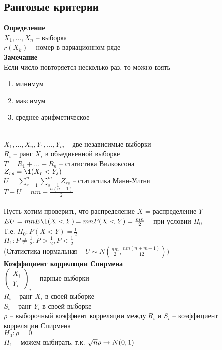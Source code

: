 \documentclass[12pt]{article}
\begin{document}
\subsection{Ранговые критерии}
\textbf{Определение}\\
$X_1, \ldots, X_n$ -- выборка\\
$r(X_k)$ -- номер в вариационном ряде\\
\textbf{Замечание}\\
Если число повторяется несколько раз, то можно взять
\begin{enumerate}
	\item минимум
	\item максимум
	\item среднее арифметическое
\end{enumerate}
\text{}\\
$X_1, \ldots, X_n, Y_1, \ldots, Y_m$ -- две независимые выборки\\
$R_i$ -- ранг $X_i$ в объединенной выборке\\
$T = R_1 + \ldots + R_n$ -- статистика Вилкоксона\\
$Z_{rs}=\1(X_r < Y_s)$\\
$U = \sum_{r=1}^n\sum_{s=1}^m Z_{rs}$ -- статистика Манн-Уитни\\
$T + U = nm + \frac{n(n+1)}{2}$\\\\
Пусть хотим проверить, что распределение $X$ = распределение $Y$\\
$E U = mn E\1(X<Y) = mnP(X < Y) = \frac{mn}2$ -- при условии $H_0$\\
Т.е. $H_0: P(X<Y) = \frac12$\\
$H_1: P \neq \frac12, P > \frac12, P < \frac12$\\
(Статистика нормальная -- $U \sim N(\frac{nm}2, \frac{nm(n+m+1)}{12}))$\\
\textbf{Коэффициент корреляции Спирмена}\\
$\left(\begin{array}{c}
	X_i\\Y_i
\end{array}\right)_i$ -- парные выборки\\
$R_i$ -- ранг $X_i$ в своей выборке\\
$S_i$ -- ранг $Y_i$ в своей выборке\\
$\rho$ -- выборочный коэффиент корреляции между $R_i$ и $S_i$ -- коэффициент корреляции Спирмена\\
$H_0: \rho = 0$\\
$H_1$ -- можем выбирать, т.к. $\sqrt{n}\rho \rightarrow N(0,1)$\\
\end{document}

